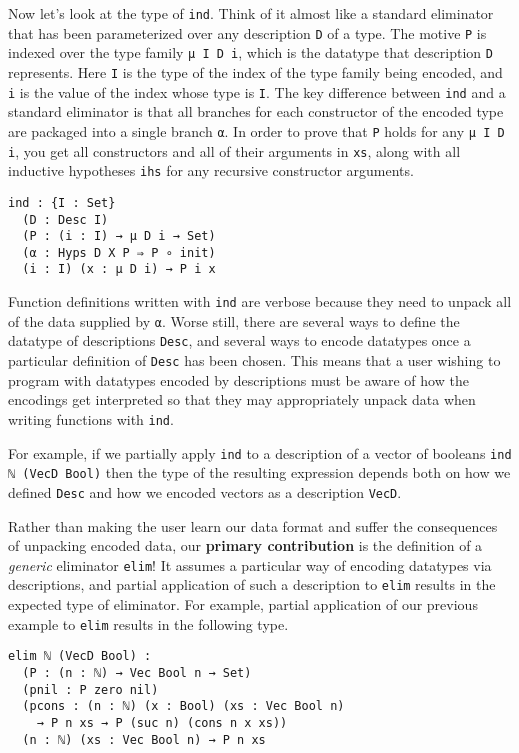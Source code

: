 \documentclass[preprint,nonatbib]{sigplanconf}
\begin{document}
Now let's look at the type of {\tt ind}. Think of it almost like a standard
eliminator that has been parameterized over any description {\tt D} of a type. The
motive {\tt P} is indexed over the type family {\tt μ I D i}, which is
the datatype that description {\tt D} represents.
Here {\tt I} is the type of the index of the type family being
encoded, and {\tt i} is the value of the index whose type is {\tt I}.
The key difference
between {\tt ind} and a standard eliminator is that all branches for
each constructor of the encoded type are packaged into a single branch
{\tt α}. In order to prove that {\tt P} holds for any
{\tt μ I D i}, you get all constructors and all of their
arguments in {\tt xs}, along with all inductive
hypotheses {\tt ihs} for any recursive constructor arguments.

\newpage

\begin{verbatim}
ind : {I : Set}
  (D : Desc I)
  (P : (i : I) → μ D i → Set)
  (α : Hyps D X P ⇒ P ∘ init)
  (i : I) (x : μ D i) → P i x
\end{verbatim}

Function definitions written with {\tt ind} are verbose
because they need to unpack all of the data supplied by {\tt α}.
Worse still, there are several ways to define the datatype of
descriptions {\tt Desc}, and several ways to encode datatypes once a
particular definition of {\tt Desc} has been chosen. This means that a
user wishing to program with datatypes encoded by descriptions must be
aware of how the encodings get interpreted so that they may
appropriately unpack data when writing functions with {\tt ind}.

For example, if we partially apply {\tt ind} to a description of a
vector of booleans {\tt ind ℕ (VecD Bool)} then the type of the
resulting expression depends both on how we defined {\tt Desc} and how
we encoded vectors as a description {\tt VecD}.

Rather than making the user learn our data format and suffer the
consequences of unpacking encoded data, our {\bf primary contribution} is
the definition of a {\it generic} eliminator {\tt elim}!
It assumes a particular way of encoding
datatypes via descriptions, and partial application of such a
description to {\tt elim} results in the expected type of eliminator.
For example, partial application of our previous example to
{\tt elim} results in the following type.

\begin{verbatim}
elim ℕ (VecD Bool) :
  (P : (n : ℕ) → Vec Bool n → Set)
  (pnil : P zero nil)
  (pcons : (n : ℕ) (x : Bool) (xs : Vec Bool n)
    → P n xs → P (suc n) (cons n x xs))
  (n : ℕ) (xs : Vec Bool n) → P n xs
\end{verbatim}
\end{document}
